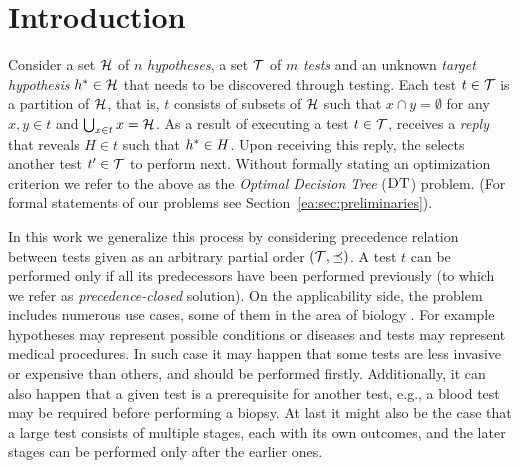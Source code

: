 \section{Introduction}

Consider a set $\mathcal{H}$ of $n$ \emph{hypotheses}, a set $\mathcal{T}$ of $m$ \emph{tests} and  an unknown \emph{target hypothesis} $h^*\in\mathcal{H}$ that needs to be discovered through testing.
Each test $t\in\mathcal{T}$ is a partition of $\mathcal{H}$, that is, $t$ consists of subsets of $\mathcal{H}$ such that $x\cap y=\emptyset$ for any $x,y\in t$ and $\bigcup_{x\in t} x=\mathcal{H}$.
As a result of executing a test $t\in\mathcal{T}$, \questioner receives a \emph{reply} that reveals $H\in t$ such that $h^*\in H$. Upon receiving this reply, the \questioner selects another test $t'\in\mathcal{T}$ to perform next.
Without formally stating an optimization criterion we refer to the above as the \emph{Optimal Decision Tree} ($\textup{\textsc{DT}}$) problem.
(For formal statements of our problems see Section~\ref{ea:sec:preliminaries}).

In this work we generalize this process by considering precedence relation between tests given as an arbitrary partial order $(\mathcal{T},\preceq)$.
A test $t$ can be performed only if all its predecessors have been performed previously (to which we refer as \emph{precedence-closed} solution).
On the applicability side, the problem includes numerous use cases, some of them in the area of biology \cite{BayesianLearnerOptimalNoisyBinarySearch}.
For example hypotheses may represent possible conditions or diseases and tests may represent medical procedures. In such case it may happen that some tests are less invasive or expensive than others, and should be performed firstly. Additionally, it can also happen that a given test is a prerequisite for another test, e.g., a blood test may be required before performing a biopsy. At last it might also be the case that a large test consists of multiple stages, each with its own outcomes, and the later stages can be performed only after the earlier ones.

% 
% 

